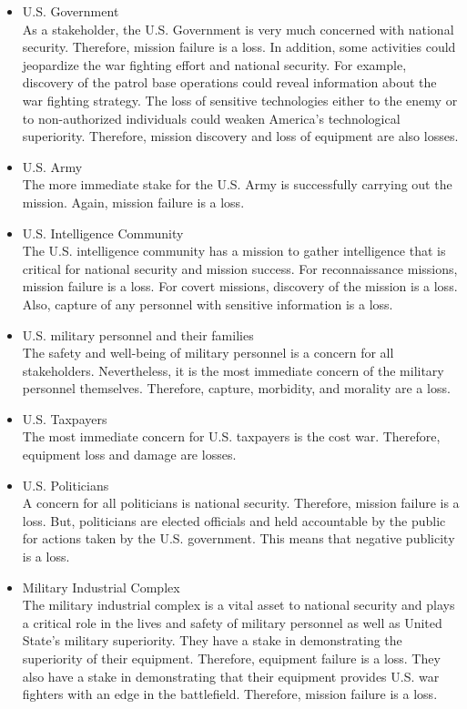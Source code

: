 \documentclass[../../main/main.tex]{subfiles}
\begin{document}
\begin{itemize}
\item U.S. Government\\
As a stakeholder, the U.S. Government is very much concerned with national security. Therefore, mission failure is a loss.  In addition, some activities could jeopardize the war fighting effort and national security.  For example, discovery of the patrol base operations could reveal information about the war fighting strategy.  The loss of sensitive technologies either to the enemy or to non-authorized individuals could weaken America's technological superiority.  Therefore, mission discovery and loss of equipment are also losses.  
\item U.S. Army\\
The more immediate stake for the U.S. Army is successfully carrying out the mission.  Again, mission failure is a loss.
\item U.S. Intelligence Community\\
The U.S. intelligence community has a mission to gather intelligence that is critical for national security and mission success.  For reconnaissance missions, mission failure is a loss. For covert missions, discovery of the mission is a loss.  Also, capture of any personnel with sensitive information is a loss. 
\item U.S. military personnel and their families\\
The safety and well-being of military personnel is a concern for all stakeholders.  Nevertheless, it is the most immediate concern of the military personnel themselves.  Therefore, capture, morbidity, and morality are a loss.
\item U.S. Taxpayers\\
The most immediate concern for U.S. taxpayers is the cost war.  Therefore, equipment loss and damage are losses.  
\item U.S. Politicians\\
A concern for all politicians is national security.  Therefore, mission failure is a loss.   But, politicians are elected officials and held accountable by the public for actions taken by the U.S. government.  This means that negative publicity is a loss.  
\item Military Industrial Complex\\
The military industrial complex is a vital asset to national security and plays a critical role in the lives and safety of military personnel as well as United State's military superiority.  They have a stake in demonstrating the superiority of their equipment.  Therefore, equipment failure is a loss.  They also have a stake in demonstrating that their equipment provides U.S. war fighters with an edge in the battlefield.  Therefore, mission failure is a loss.

\end{itemize}
\end{document}
